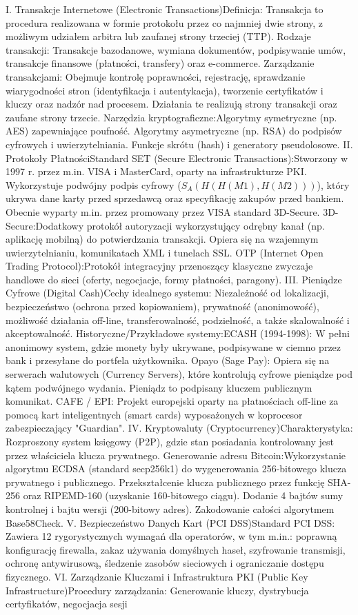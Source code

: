 I. Transakcje Internetowe (Electronic Transactions)Definicja: Transakcja to procedura realizowana w formie protokołu przez co najmniej dwie strony, z możliwym udziałem arbitra lub zaufanej strony trzeciej (TTP).  Rodzaje transakcji: Transakcje bazodanowe, wymiana dokumentów, podpisywanie umów, transakcje finansowe (płatności, transfery) oraz e-commerce.  Zarządzanie transakcjami: Obejmuje kontrolę poprawności, rejestrację, sprawdzanie wiarygodności stron (identyfikacja i autentykacja), tworzenie certyfikatów i kluczy oraz nadzór nad procesem. Działania te realizują strony transakcji oraz zaufane strony trzecie.  Narzędzia kryptograficzne:Algorytmy symetryczne (np. AES) zapewniające poufność.  Algorytmy asymetryczne (np. RSA) do podpisów cyfrowych i uwierzytelniania.  Funkcje skrótu (hash) i generatory pseudolosowe.  II. Protokoły PłatnościStandard SET (Secure Electronic Transactions):Stworzony w 1997 r. przez m.in. VISA i MasterCard, oparty na infrastrukturze PKI.  Wykorzystuje podwójny podpis cyfrowy ($S_A(H(H(M1), H(M2)))$), który ukrywa dane karty przed sprzedawcą oraz specyfikację zakupów przed bankiem.  Obecnie wyparty m.in. przez promowany przez VISA standard 3D-Secure.  3D-Secure:Dodatkowy protokół autoryzacji wykorzystujący odrębny kanał (np. aplikację mobilną) do potwierdzania transakcji.  Opiera się na wzajemnym uwierzytelnianiu, komunikatach XML i tunelach SSL.  OTP (Internet Open Trading Protocol):Protokół integracyjny przenoszący klasyczne zwyczaje handlowe do sieci (oferty, negocjacje, formy płatności, paragony).  III. Pieniądze Cyfrowe (Digital Cash)Cechy idealnego systemu: Niezależność od lokalizacji, bezpieczeństwo (ochrona przed kopiowaniem), prywatność (anonimowość), możliwość działania off-line, transferowalność, podzielność, a także skalowalność i akceptowalność.  Historyczne/Przykładowe systemy:ECASH (1994-1998): W pełni anonimowy system, gdzie monety były ukrywane, podpisywane w ciemno przez bank i przesyłane do portfela użytkownika.  Opayo (Sage Pay): Opiera się na serwerach walutowych (Currency Servers), które kontrolują cyfrowe pieniądze pod kątem podwójnego wydania. Pieniądz to podpisany kluczem publicznym komunikat.  CAFE / EPI: Projekt europejski oparty na płatnościach off-line za pomocą kart inteligentnych (smart cards) wyposażonych w koprocesor zabezpieczający "Guardian".  IV. Kryptowaluty (Cryptocurrency)Charakterystyka: Rozproszony system księgowy (P2P), gdzie stan posiadania kontrolowany jest przez właściciela klucza prywatnego.  Generowanie adresu Bitcoin:Wykorzystanie algorytmu ECDSA (standard secp256k1) do wygenerowania 256-bitowego klucza prywatnego i publicznego.  Przekształcenie klucza publicznego przez funkcję SHA-256 oraz RIPEMD-160 (uzyskanie 160-bitowego ciągu).  Dodanie 4 bajtów sumy kontrolnej i bajtu wersji (200-bitowy adres).  Zakodowanie całości algorytmem Base58Check.  V. Bezpieczeństwo Danych Kart (PCI DSS)Standard PCI DSS: Zawiera 12 rygorystycznych wymagań dla operatorów, w tym m.in.: poprawną konfigurację firewalla, zakaz używania domyślnych haseł, szyfrowanie transmisji, ochronę antywirusową, śledzenie zasobów sieciowych i ograniczanie dostępu fizycznego.  VI. Zarządzanie Kluczami i Infrastruktura PKI (Public Key Infrastructure)Procedury zarządzania: Generowanie kluczy, dystrybucja certyfikatów, negocjacja sesji 